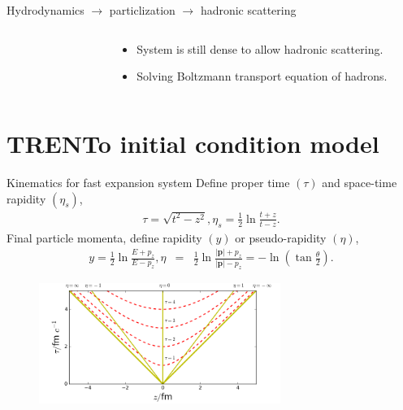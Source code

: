\documentclass[11pt]{beamer}
\begin{document}
\begin{frame}{Hydrodynamics $\rightarrow$ particlization $\rightarrow$ hadronic scattering}
\begin{columns}
\begin{column}{0.15\textwidth}
\begin{figure}
\begin{center}
	\end{center} 	
  	\end{figure}
  \end{column}
  \begin{column}{0.85\textwidth}
  \begin{itemize}
  	\item System is still dense to allow hadronic scattering.
	\item Solving Boltzmann transport equation of hadrons.
  \end{itemize}
  \end{column}
\end{columns}

\end{frame}


\section{TRENTo initial condition model}
\begin{frame}{Kinematics for fast expansion system}
Define proper time $(\tau)$ and space-time rapidity $(\eta_s)$,
\begin{eqnarray}
\tau = \sqrt{t^2 - z^2}, \eta_s = \frac{1}{2}\ln\frac{t+z}{t-z}. 
\end{eqnarray}
Final particle momenta, define rapidity $(y)$ or pseudo-rapidity $(\eta)$,
\begin{eqnarray}
 y = \frac{1}{2}\ln\frac{E+p_z}{E-p_z}, \eta &=& \frac{1}{2}\ln\frac{|\mathbf{p}|+p_z}{|\mathbf{p}|-p_z} = -\ln\left(\tan\frac{\theta}{2}\right). 
\end{eqnarray}
\begin{center}
\begin{figure}
\includegraphics[width=0.7\textwidth]{./pics/curv.png}
\end{figure}
\end{center}
\end{frame}
\end{document}
